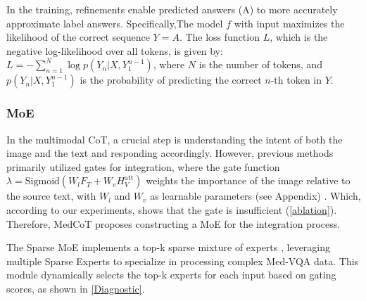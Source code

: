 \documentclass[11pt]{article}
\begin{document}



In the training, refinements enable predicted answers (A) to more accurately approximate label answers. Specifically,The model $f$ with input maximizes the likelihood of the correct sequence $Y = {A}$. The loss function $L$, which is the negative log-likelihood over all tokens, is given by: $L = -\sum_{n=1}^{N} \log p(Y_n | X, Y_1^{n-1})$, where $N$ is the number of tokens, and $p(Y_n | X, Y_1^{n-1})$ is the probability of predicting the correct $n$-th token in $Y$. 
\subsubsection{MoE}

In the multimodal CoT, a crucial step is understanding the intent of both the image and the text and responding accordingly. 
However, previous methods primarily utilized gates for integration, where the gate function \( \lambda = \text{Sigmoid}(W_l F_T + W_v H_V^{\text{att}}) \) weights the importance of the image relative to the source text, with \( W_l \) and \( W_v \) as learnable parameters (see Appendix) \cite{zhang2023multimodal, zheng2023ddcot}.
Which, according to our experiments, shows that the gate is insufficient (\autoref{ablation}).
Therefore, MedCoT proposes constructing a MoE for the integration process.

The Sparse MoE implements a top-k sparse mixture of experts \cite{fedus2022switch}, leveraging multiple Sparse Experts to specialize in processing complex Med-VQA data. 
This module dynamically selects the top-k experts for each input based on gating scores, as shown in \autoref{Diagnostic}. 
\end{document}
